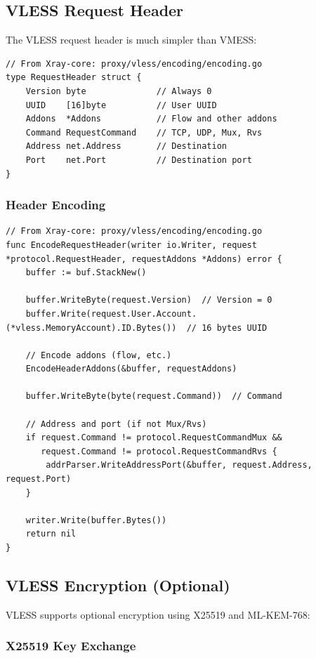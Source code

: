 \subsection{VLESS Request Header}

The VLESS request header is much simpler than VMESS:

\begin{verbatim}
// From Xray-core: proxy/vless/encoding/encoding.go
type RequestHeader struct {
    Version byte              // Always 0
    UUID    [16]byte          // User UUID
    Addons  *Addons           // Flow and other addons
    Command RequestCommand    // TCP, UDP, Mux, Rvs
    Address net.Address       // Destination
    Port    net.Port          // Destination port
}
\end{verbatim}

\subsubsection{Header Encoding}

\begin{verbatim}
// From Xray-core: proxy/vless/encoding/encoding.go
func EncodeRequestHeader(writer io.Writer, request *protocol.RequestHeader, requestAddons *Addons) error {
    buffer := buf.StackNew()
    
    buffer.WriteByte(request.Version)  // Version = 0
    buffer.Write(request.User.Account.(*vless.MemoryAccount).ID.Bytes())  // 16 bytes UUID
    
    // Encode addons (flow, etc.)
    EncodeHeaderAddons(&buffer, requestAddons)
    
    buffer.WriteByte(byte(request.Command))  // Command
    
    // Address and port (if not Mux/Rvs)
    if request.Command != protocol.RequestCommandMux && 
       request.Command != protocol.RequestCommandRvs {
        addrParser.WriteAddressPort(&buffer, request.Address, request.Port)
    }
    
    writer.Write(buffer.Bytes())
    return nil
}
\end{verbatim}

\subsection{VLESS Encryption (Optional)}

VLESS supports optional encryption using X25519 and ML-KEM-768:

\subsubsection{X25519 Key Exchange}

